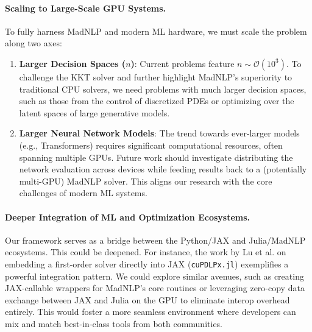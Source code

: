 \documentclass[11pt]{article}
\begin{document}
\paragraph{Scaling to Large-Scale GPU Systems.}
To fully harness MadNLP and modern ML hardware, we must scale the problem along two axes:
\begin{enumerate}[leftmargin=1.5em]
    \item \textbf{Larger Decision Spaces ($n$)}: Current problems feature $n \sim \mathcal{O}(10^3)$. To challenge the KKT solver and further highlight MadNLP’s superiority to traditional CPU solvers, we need problems with much larger decision spaces, such as those from the control of discretized PDEs or optimizing over the latent spaces of large generative models.
    \item \textbf{Larger Neural Network Models}: The trend towards ever-larger models (e.g., Transformers) requires significant computational resources, often spanning multiple GPUs. Future work should investigate distributing the network evaluation across devices while feeding results back to a (potentially multi-GPU) MadNLP solver. This aligns our research with the core challenges of modern ML systems.
\end{enumerate}

\paragraph{Deeper Integration of ML and Optimization Ecosystems.}
Our framework serves as a bridge between the Python/JAX and Julia/MadNLP ecosystems. This could be deepened. For instance, the work by Lu et al. on embedding a first-order solver directly into JAX (\texttt{cuPDLPx.jl}) exemplifies a powerful integration pattern. We could explore similar avenues, such as creating JAX-callable wrappers for MadNLP's core routines or leveraging zero-copy data exchange between JAX and Julia on the GPU to eliminate interop overhead entirely. This would foster a more seamless environment where developers can mix and match best-in-class tools from both communities.
\end{document}
